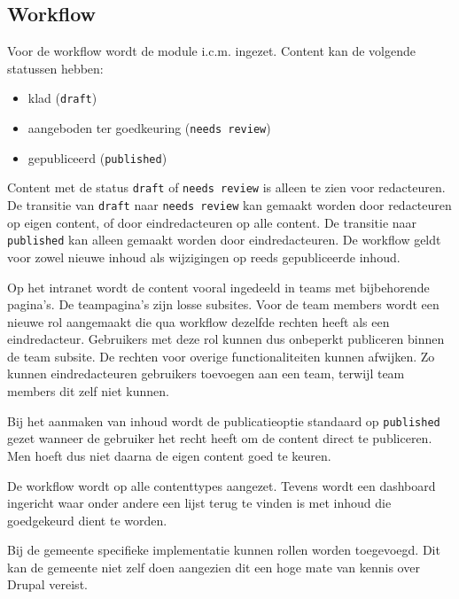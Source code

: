 \subsection{Workflow}\label{workflow}
Voor de workflow wordt de  module i.c.m.  ingezet. Content kan de volgende statussen hebben:
\begin{itemize}
\item klad (\texttt{draft})
\item aangeboden ter goedkeuring (\texttt{needs review})
\item gepubliceerd (\texttt{published})
\end{itemize}
Content met de status \texttt{draft} of \texttt{needs review} is alleen te zien voor redacteuren. De transitie van \texttt{draft} naar \texttt{needs review} kan gemaakt worden door redacteuren op eigen content, of door eindredacteuren op alle content. De transitie naar \texttt{published} kan alleen gemaakt worden door eindredacteuren. De workflow geldt voor zowel nieuwe inhoud als wijzigingen op reeds gepubliceerde inhoud.

Op het intranet wordt de content vooral ingedeeld in teams met bijbehorende pagina's. De teampagina's zijn losse subsites. Voor de team members wordt een nieuwe rol aangemaakt die qua workflow dezelfde rechten heeft als een eindredacteur. Gebruikers met deze rol kunnen dus onbeperkt publiceren binnen de team subsite. De rechten voor overige functionaliteiten kunnen afwijken. Zo kunnen eindredacteuren gebruikers toevoegen aan een team, terwijl team members dit zelf niet kunnen.

Bij het aanmaken van inhoud wordt de publicatieoptie standaard op \texttt{published} gezet wanneer de gebruiker het recht heeft om de content direct te publiceren. Men hoeft dus niet daarna de eigen content goed te keuren.

De workflow wordt op alle contenttypes aangezet. Tevens wordt een dashboard ingericht waar onder andere een lijst terug te vinden is met inhoud die goedgekeurd dient te worden.

Bij de gemeente specifieke implementatie kunnen rollen worden toegevoegd. Dit kan de gemeente niet zelf doen aangezien dit een hoge mate van kennis over Drupal vereist.


